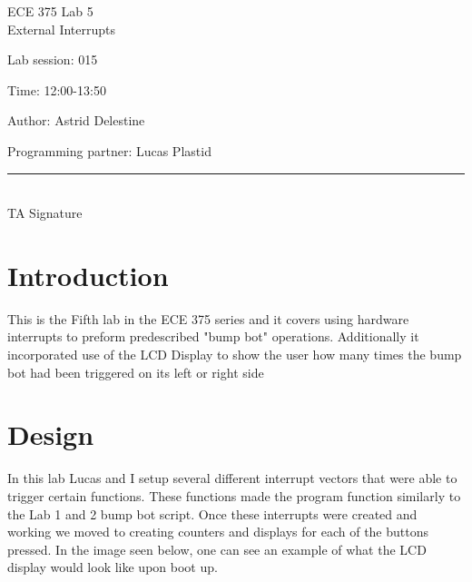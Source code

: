 \documentclass[12pt,letterpaper]{article}
\begin{document}
\begin{titlepage}
    \vspace*{4cm}
    \begin{flushright}
    {\huge
        ECE 375 Lab 5\\[1cm]
    }
    {\large
    	External Interrupts
    }
    \end{flushright}
    \begin{flushleft}
    Lab session: 015
    
    Time: 12:00-13:50
    \end{flushleft}
    \begin{flushright}
    Author: Astrid Delestine

    Programming partner: Lucas Plastid 

    \vfill
    \rule{5in}{.5mm}\\
    TA Signature
    \end{flushright}

\end{titlepage}

\section{Introduction}
This is the Fifth lab in the ECE 375 series and it covers using hardware interrupts to preform predescribed "bump bot" operations. Additionally it incorporated use of the LCD Display to show the user how many times the bump bot had been triggered on its left or right side

\section{Design}
In this lab Lucas and I setup several different interrupt vectors that were able to trigger certain functions. These functions made the program function similarly to the Lab 1 and 2 bump bot script. Once these interrupts were created and working we moved to creating counters and displays for each of the buttons pressed. In the image seen below, one can see an example of what the LCD display would look like upon boot up. 
\end{document}
